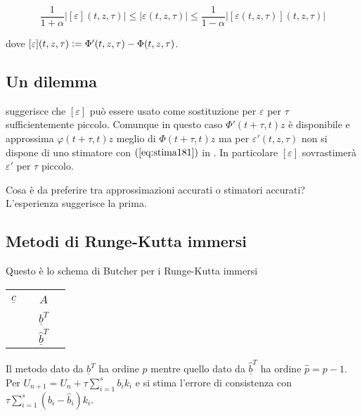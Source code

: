 \documentclass[hidelinks, 10pt]{report}
\begin{document}
\begin{equation}	\label{eq:stima181}
\frac{1}{1 + \alpha} \vert [\varepsilon](t, z, \tau) \vert \le \vert \varepsilon(t, z, \tau) \vert \le \frac{1}{1 - \alpha} \vert [\varepsilon(t, z, \tau)](t, z, \tau) \vert
\end{equation}

dove $ [\varepsilon](t, z, \tau) \vcentcolon= \Phi'(t, z, \tau) - \Phi(t, z, \tau) $.

\subsection{Un dilemma}
 suggerisce che $ [\varepsilon] $ pu\`o essere usato come sostituzione per $ \varepsilon $ per $ \tau $ sufficientemente piccolo. %
Comunque in questo caso $ \Phi'(t + \tau, t)z $ \`e disponibile e approssima $ \varphi(t + \tau, t)z $ meglio di $ \Phi(t + \tau, t)z $ ma per $ \varepsilon'(t, z, \tau) $ non si dispone di uno stimatore con $ (\ref{eq:stima181}) $ in . In particolare $ [\varepsilon] $ sovrastimer\`a $ \varepsilon' $ per $ \tau $ piccolo.

Cosa \`e da preferire tra approssimazioni accurati o stimatori accurati? L'esperienza suggerisce la prima.

\subsection{Metodi di Runge-Kutta immersi}
Questo \`e lo schema di Butcher per  i Runge-Kutta immersi

\begin{center}
\begin{tabular}{c|ccc}
                  &   &       & \\
$ \underline{c} $ &   & $ A $ & \\
				  &   &       & \\
\hline
				  &   & $ \underline{b}^{T} $ & \\
\hline
				  &   & $ \hat{\underline{b}}^{T} $ & \\
\end{tabular}
\end{center}

Il metodo dato da $ \underline{b}^{T} $ ha ordine $ p $ mentre quello dato da $ \hat{\underline{b}}^{T} $ ha ordine $ \hat{p} = p - 1 $. Per $ U_{n + 1} = U_{n} + \tau \sum\limits_{i = 1}^{s} b_{i} k_{i} $ e si stima l'errore di consistenza con $ \tau \sum\limits_{i = 1}^{s} (b_{i} - \hat{b}_{i}) k_{i} $.
\end{document}
